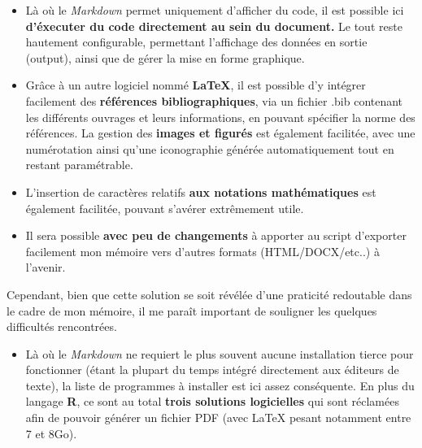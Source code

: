 \documentclass[
  11pt,
  french,
]{article}
\providecommand{\tightlist}{%
  \setlength{\itemsep}{0pt}\setlength{\parskip}{0pt}}
\begin{document}
\begin{itemize}
\item
  Là où le \emph{Markdown} permet uniquement d'afficher du code, il est
  possible ici \textbf{d'éxecuter du code directement au sein du
  document.} Le tout reste hautement configurable, permettant
  l'affichage des données en sortie (output), ainsi que de gérer la mise
  en forme graphique.
\item
  Grâce à un autre logiciel nommé \textbf{LaTeX}, il est possible d'y
  intégrer facilement des \textbf{références bibliographiques}, via un
  fichier .bib contenant les différents ouvrages et leurs informations,
  en pouvant spécifier la norme des références. La gestion des
  \textbf{images et figurés} est également facilitée, avec une
  numérotation ainsi qu'une iconographie générée automatiquement tout en
  restant paramétrable.
\item
  L'insertion de caractères relatifs \textbf{aux notations
  mathématiques} est également facilitée, pouvant s'avérer extrêmement
  utile.
\item
  Il sera possible \textbf{avec peu de changements} à apporter au script
  d'exporter facilement mon mémoire vers d'autres formats
  (HTML/DOCX/etc..) à l'avenir.
\end{itemize}

Cependant, bien que cette solution se soit révélée d'une praticité
redoutable dans le cadre de mon mémoire, il me paraît important de
souligner les quelques difficultés rencontrées.

\begin{itemize}
\tightlist
\item
  Là où le \emph{Markdown} ne requiert le plus souvent aucune
  installation tierce pour fonctionner (étant la plupart du temps
  intégré directement aux éditeurs de texte), la liste de programmes à
  installer est ici assez conséquente. En plus du langage \textbf{R}, ce
  sont au total \textbf{trois solutions logicielles} qui sont réclamées
  afin de pouvoir générer un fichier PDF (avec LaTeX pesant notamment
  entre 7 et 8Go).
\end{itemize}
\end{document}

